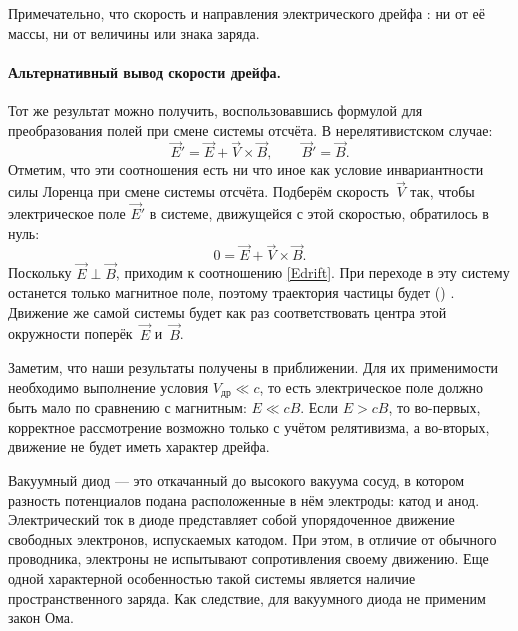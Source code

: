 Примечательно, что скорость и направления электрического дрейфа
: ни от её массы,
ни от величины или знака заряда.


\paragraph{Альтернативный вывод скорости дрейфа.}
Тот же результат можно получить, воспользовавшись формулой для
преобразования полей при смене системы отсчёта. В нерелятивистском
случае:
\[
\vec{E}' = \vec{E} + \vec{V}\times \vec{B},\qquad \vec{B}'=\vec{B}.
\]
Отметим, что эти соотношения есть ни что иное как условие инвариантности силы
Лоренца при смене системы отсчёта. Подберём скорость~$\vec{V}$ так, чтобы
электрическое поле $\vec{E}'$ в системе, движущейся с этой скоростью, обратилось
в нуль:
\[
 0 = \vec{E} + \vec{V}\times \vec{B}.
\]
Поскольку $\vec{E}\perp \vec{B}$, приходим к соотношению \eqref{Edrift}.
При переходе в эту систему останется только магнитное поле, поэтому
траектория частицы будет  ()
. Движение же самой системы будет как раз соответствовать
 центра этой окружности поперёк~$\vec{E}$ и~$\vec{B}$.

\begin{lab:note}
Заметим, что наши результаты получены в 
приближении. Для их применимости необходимо выполнение условия $V_{др}\ll c$,
то есть электрическое поле должно быть мало по сравнению с магнитным: $E\ll cB$.
Если $E>cB$, то во-первых, корректное рассмотрение возможно только с учётом
релятивизма, а во-вторых, движение не будет иметь характер дрейфа.
\end{lab:note}



Вакуумный диод --- это откачанный до высокого вакуума сосуд,
в котором разность потенциалов подана расположенные в нём электроды:
катод и анод. Электрический ток в диоде представляет собой упорядоченное
движение свободных электронов, испускаемых катодом.  При этом,
в отличие от обычного проводника, электроны не испытывают сопротивления
своему движению. Еще одной характерной особенностью такой системы
является наличие пространственного заряда. Как следствие, для вакуумного
диода не применим закон Ома.


